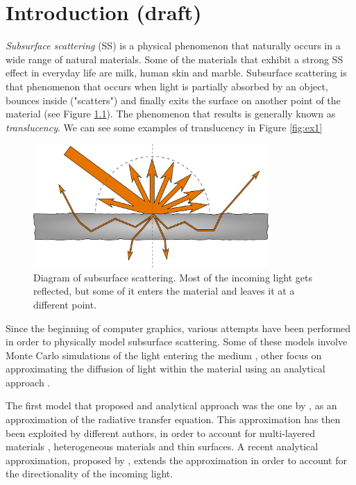 \chapter{Introduction (draft)}
\emph{Subsurface scattering} (SS) is a physical phenomenon that naturally occurs in a wide range of natural materials. Some of the materials that exhibit a strong SS effect in everyday life are milk, human skin and marble. Subsurface scattering is that phenomenon that occurs when light is partially absorbed by an object, bounces inside ("scatters") and finally exits the surface on another point of the material (see Figure \ref{fig:ssdiagram}). The phenomenon that results is generally known as \emph{translucency}. We can see some examples of translucency in Figure \ref{fig:ex1}

\begin{figure}[!ht]
\centering
\includegraphics[width=0.8\textwidth]{images/diagram.pdf}
\caption{Diagram of subsurface scattering. Most of the incoming light gets reflected, but some of it enters the material and leaves it at a different point.}
\label{fig:ssdiagram}
\end{figure}

Since the beginning of computer graphics, various attempts have been performed in order to physically model subsurface scattering. Some of these models involve Monte Carlo simulations of the light entering the medium \citep{Pharr:2000:MCE:344779.344824}, other focus on approximating the diffusion of light within the material using an analytical approach \citep{Jensen:2001:PMS:383259.383319}.
 
The first model that proposed and analytical approach was the one by \cite{Jensen:2001:PMS:383259.383319}, as an approximation of the radiative transfer equation. This approximation has then been exploited by different authors, in order to account for multi-layered materials \citep{Donner:2005:LDM:1186822.1073308}, heterogeneous materials \citep{journals/cgf/WangWHSYG10} and thin surfaces\citep{journals/cgf/WangWHSYG10}. A recent analytical approximation, proposed by \cite{IMM2013-06646}, extends the approximation in order to account for the directionality of the incoming light. 


